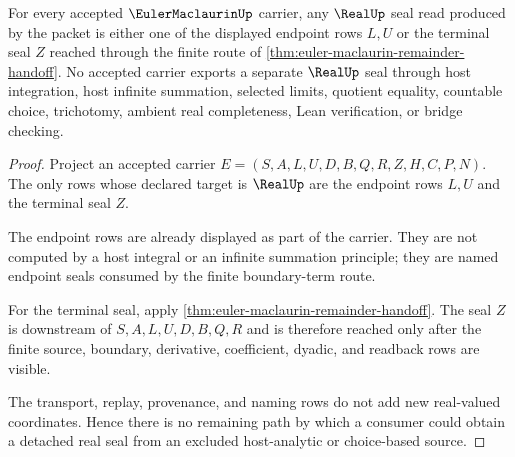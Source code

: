 \begin{theorem}
\label{thm:euler-maclaurin-real-seal-nonescape}
For every accepted $\EulerMaclaurinUp$ carrier, any $\RealUp$ seal read produced by the packet is either one of the displayed endpoint rows $L,U$ or the terminal seal $Z$ reached through the finite route of \autoref{thm:euler-maclaurin-remainder-handoff}. No accepted carrier exports a separate $\RealUp$ seal through host integration, host infinite summation, selected limits, quotient equality, countable choice, trichotomy, ambient real completeness, Lean verification, or bridge checking.
\end{theorem}
\begin{proof}
Project an accepted carrier $E=(S,A,L,U,D,B,Q,R,Z,H,C,P,N)$. The only rows whose declared target is $\RealUp$ are the endpoint rows $L,U$ and the terminal seal $Z$.

The endpoint rows are already displayed as part of the carrier. They are not computed by a host integral or an infinite summation principle; they are named endpoint seals consumed by the finite boundary-term route.

For the terminal seal, apply \autoref{thm:euler-maclaurin-remainder-handoff}. The seal $Z$ is downstream of $S,A,L,U,D,B,Q,R$ and is therefore reached only after the finite source, boundary, derivative, coefficient, dyadic, and readback rows are visible.

The transport, replay, provenance, and naming rows do not add new real-valued coordinates. Hence there is no remaining path by which a consumer could obtain a detached real seal from an excluded host-analytic or choice-based source.
\end{proof}


